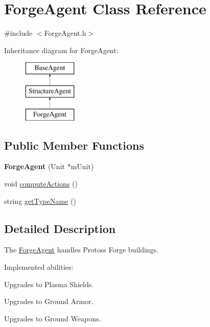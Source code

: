 \hypertarget{class_forge_agent}{
\section{ForgeAgent Class Reference}
\label{class_forge_agent}
}


{\ttfamily \#include $<$ForgeAgent.h$>$}

Inheritance diagram for ForgeAgent:\begin{figure}[H]
\begin{center}
\leavevmode
\includegraphics[height=3.000000cm]{class_forge_agent}
\end{center}
\end{figure}
\subsection*{Public Member Functions}
\begin{DoxyCompactItemize}
\item 
\hypertarget{class_forge_agent_a1b3faf02ca94e537b6aab5de10f1580b}{
{\bfseries ForgeAgent} (Unit $\ast$mUnit)}
\label{class_forge_agent_a1b3faf02ca94e537b6aab5de10f1580b}

\item 
void \hyperlink{class_forge_agent_a21d377c389696bbe1df52e61563cf7a1}{computeActions} ()
\item 
string \hyperlink{class_forge_agent_a970cd61ae3848503baea3047659a30d9}{getTypeName} ()
\end{DoxyCompactItemize}


\subsection{Detailed Description}
The \hyperlink{class_forge_agent}{ForgeAgent} handles Protoss Forge buildings.

Implemented abilities:
\begin{DoxyItemize}
\item Upgrades to Plasma Shields.
\item Upgrades to Ground Armor.
\item Upgrades to Ground Weapons.
\end{DoxyItemize}

